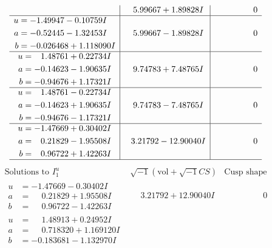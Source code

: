 \documentclass[1p]{elsarticle_modified}
\theoremstyle{definition}
\newcommand{\I}{\sqrt{-1}}
\begin{document}
$$\begin{array}{c|c|c}
 & \phantom{-}5.99667 + 1.89828 I & \phantom{-0.000000 } 0 \\ \hline\begin{aligned}
u &= -1.49947 - 0.10759 I \\
a &= -0.52445 - 1.32453 I \\
b &= -0.026468 + 1.118090 I\end{aligned}
 & \phantom{-}5.99667 - 1.89828 I & \phantom{-0.000000 } 0 \\ \hline\begin{aligned}
u &= \phantom{-}1.48761 + 0.22734 I \\
a &= -0.14623 - 1.90635 I \\
b &= -0.94676 + 1.17321 I\end{aligned}
 & \phantom{-}9.74783 + 7.48765 I & \phantom{-0.000000 } 0 \\ \hline\begin{aligned}
u &= \phantom{-}1.48761 - 0.22734 I \\
a &= -0.14623 + 1.90635 I \\
b &= -0.94676 - 1.17321 I\end{aligned}
 & \phantom{-}9.74783 - 7.48765 I & \phantom{-0.000000 } 0 \\ \hline\begin{aligned}
u &= -1.47669 + 0.30402 I \\
a &= \phantom{-}0.21829 - 1.95508 I \\
b &= \phantom{-}0.96722 + 1.42263 I\end{aligned}
 & \phantom{-}3.21792 - 12.90040 I & \phantom{-0.000000 } 0\\
 \hline 
 \end{array}$$\newpage$$\begin{array}{c|c|c}  
\text{Solutions to }I^u_{1}& \I (\text{vol} + \sqrt{-1}CS) & \text{Cusp shape}\\
 \hline 
\begin{aligned}
u &= -1.47669 - 0.30402 I \\
a &= \phantom{-}0.21829 + 1.95508 I \\
b &= \phantom{-}0.96722 - 1.42263 I\end{aligned}
 & \phantom{-}3.21792 + 12.90040 I & \phantom{-0.000000 } 0 \\ \hline\begin{aligned}
u &= \phantom{-}1.48913 + 0.24952 I \\
a &= \phantom{-}0.718320 + 1.169120 I \\
b &= -0.183681 - 1.132970 I\end{aligned}

\end{array}$$
\end{document}
